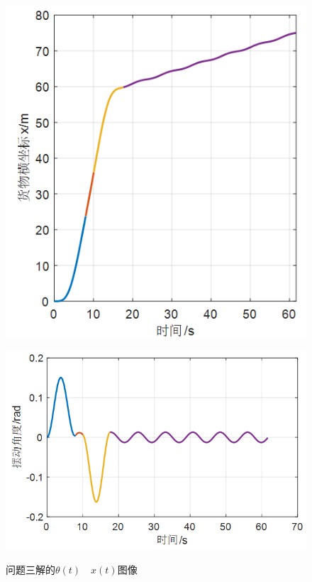 \documentclass[withoutpreface,bwprint]{cumcmthesis} %
\begin{document}
\begin{figure}[!h]
    \centering
    \begin{minipage}[c]{0.48\textwidth}
        \centering
        \includegraphics[width=\textwidth]{p3x.png}
        \label{fig:sample-figure-a}
    \end{minipage}
    \begin{minipage}[c]{0.48\textwidth}
        \centering
        \includegraphics[width=\textwidth]{p3theta.png}
        \label{fig:sample-figure-b}
    \end{minipage}
    \caption{问题三解的$\theta(t)\quad x(t)$图像}
    \label{fig:sample-figure}
\end{figure}
\end{document}
